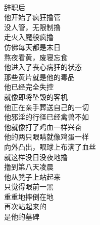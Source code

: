 \begin{poem}[疯撸的第八天]
    \begin{multicols}{2}
        \begin{center}~\\
            辞职后 \\ 他开始了疯狂撸管 \\ 没人管，无限制撸 \\ 走火入魔般疯撸 \\ 仿佛每天都是末日 \\ 熬夜看黄，废寝忘食 \\ 他进入了丧心病狂的状态 \\ 那些黄片就是他的毒品 \\ 他已经完全失控 \\ 就像即将坠毁的客机 \\ 他正在亲手葬送自己的一切 \\ 他邪淫的行径已经禽兽不如 \\ 他就像打了鸡血一样兴奋 \\ 他的两只眼睛就像鸡蛋一样 \\ 向外凸出，眼球上布满了血丝 \\ 就这样没日没夜地撸 \\ 撸到第八天凌晨 \\ 他从凳子上站起来 \\ 只觉得眼前一黑 \\ 重重地摔倒在地 \\ 再次站起来的 \\ 是他的墓碑
        \end{center}
    \end{multicols}
\end{poem}

